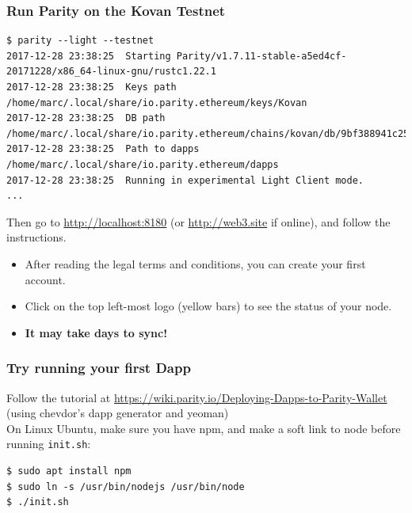 \begin{frame}[fragile]
	\frametitle{Run Parity on the Kovan Testnet}
	\begin{Verbatim}[fontsize=\tiny]
$ parity --light --testnet
2017-12-28 23:38:25  Starting Parity/v1.7.11-stable-a5ed4cf-20171228/x86_64-linux-gnu/rustc1.22.1
2017-12-28 23:38:25  Keys path /home/marc/.local/share/io.parity.ethereum/keys/Kovan
2017-12-28 23:38:25  DB path /home/marc/.local/share/io.parity.ethereum/chains/kovan/db/9bf388941c25ea98
2017-12-28 23:38:25  Path to dapps /home/marc/.local/share/io.parity.ethereum/dapps
2017-12-28 23:38:25  Running in experimental Light Client mode.
...
	\end{Verbatim}
	Then go to \url{http://localhost:8180} (or \url{http://web3.site} if online), and follow the instructions.
	\begin{itemize}
		\item After reading the legal terms and conditions, you can create your first account.
		\item Click on the top left-most logo (yellow bars) to see the status of your node.
		\item \textbf{It may take days to sync!}
	\end{itemize}
\end{frame}

\begin{frame}[fragile]
	\frametitle{Try running your first Dapp}
	Follow the tutorial at \url{https://wiki.parity.io/Deploying-Dapps-to-Parity-Wallet} (using chevdor’s dapp generator and yeoman)\\
	\vspace{1em}
	On Linux Ubuntu, make sure you have npm, and make a soft link to node before running \texttt{init.sh}:
	\begin{Verbatim}[fontsize=\tiny]
$ sudo apt install npm
$ sudo ln -s /usr/bin/nodejs /usr/bin/node 
$ ./init.sh
	\end{Verbatim}	
\end{frame}



